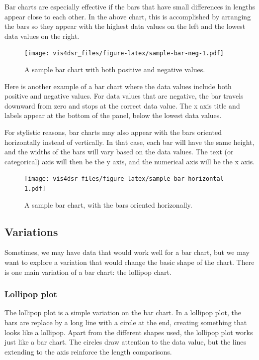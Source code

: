 \documentclass[
]{krantz}
\begin{document}
Bar charts are especially effective if the bars that have small differences in
lengths appear close to each other. In the above chart, this is accomplished by
arranging the bars so they appear with the highest data values on the left and
the lowest data values on the right.

\begin{figure}
\centering
\texttt{[image: vis4dsr\_files/figure-latex/sample-bar-neg-1.pdf]}
\caption{\label{fig:sample-bar-neg}A sample bar chart with both positive and negative values.}
\end{figure}

Here is another example of a bar chart where the data values include both positive
and negative values. For data values that are negative, the bar travels downward
from zero and stops at the correct data value. The x axis title and labels appear
at the bottom of the panel, below the lowest data values.

For stylistic reasons, bar charts may also appear with the bars oriented horizontally
instead of vertically. In that case, each bar will have the same height, and the widths
of the bars will vary based on the data values. The text (or categorical) axis will then
be the y axis, and the numerical axis will be the x axis.

\begin{figure}
\centering
\texttt{[image: vis4dsr\_files/figure-latex/sample-bar-horizontal-1.pdf]}
\caption{\label{fig:sample-bar-horizontal}A sample bar chart, with the bars oriented horizonally.}
\end{figure}

\hypertarget{variations}{%
\subsection{Variations}\label{variations}}

Sometimes, we may have data that would work well for a bar chart, but we may want to
explore a variation that would change the basic shape of the chart. There is one main
variation of a bar chart: the lollipop chart.

\hypertarget{lollipop-plot}{%
\subsubsection{Lollipop plot}\label{lollipop-plot}}

The lollipop plot is a simple variation on the bar chart. In a lollipop plot,
the bars are replace by a long line with a circle at the end, creating something
that looks like a lollipop. Apart from the different shapes used, the lollipop plot
works just like a bar chart. The circles draw attention to the data value, but the
lines extending to the axis reinforce the length comparisons.
\end{document}
